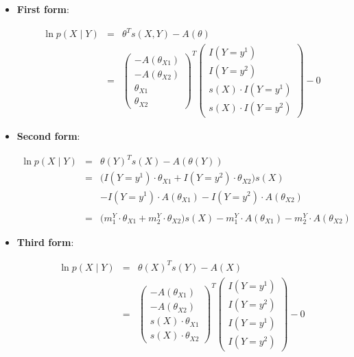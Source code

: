 \documentclass[11pt, oneside]{article}   	%
\numberwithin{figure}{section}
\numberwithin{equation}{section}
\numberwithin{table}{section}
\theoremstyle{definition}
\begin{document}
\begin{appendices}
\begin{itemize}
\item \textbf{First form}:

\begin{eqnarray*}
\ln p(X \mid Y) &=& \theta^T s(X,Y) - A(\theta) \\
&=&
\begin{pmatrix}
- A(\theta_{X1}) \\
- A(\theta_{X2}) \\
\theta_{X1} \\
\theta_{X2}
\end{pmatrix}^T
\begin{pmatrix}
I(Y=y^1) \\
I(Y=y^2) \\
s(X) \cdot I(Y=y^1) \\
s(X) \cdot I(Y=y^2)
\end{pmatrix}
- 0 
\end{eqnarray*}

\item \textbf{Second form}:

\begin{eqnarray*}
\ln p(X \mid Y) &=& \theta(Y)^Ts(X) - A(\theta(Y)) \\
&=&
\Big(I(Y=y^1) \cdot \theta_{X1} + I(Y=y^2) \cdot \theta_{X2}\Big)
s(X) \\
&&- I(Y=y^1) \cdot  A(\theta_{X1}) -  I(Y=y^2) \cdot A(\theta_{X2})\\\\
&=&
\Big(m^Y_1 \cdot \theta_{X1} + 
m^Y_2 \cdot \theta_{X2}\Big)
s(X) 
-  m^Y_1 \cdot  A(\theta_{X1}) -  m^Y_2  \cdot A(\theta_{X2})
\end{eqnarray*}

\item \textbf{Third form}:

\begin{eqnarray*}
\ln p(X \mid Y) &=& \theta(X)^T s(Y) - A(X) \\
&=&
\begin{pmatrix}
- A(\theta_{X1}) \\
- A(\theta_{X2})\\
s(X) \cdot \theta_{X1}\\
s(X) \cdot \theta_{X2}
\end{pmatrix}^T
\begin{pmatrix}
I(Y=y^1) \\
I(Y=y^2) \\
I(Y=y^1) \\
I(Y=y^2)
\end{pmatrix}
- 0
\end{eqnarray*}


\end{itemize}
\end{appendices}
\end{document}
